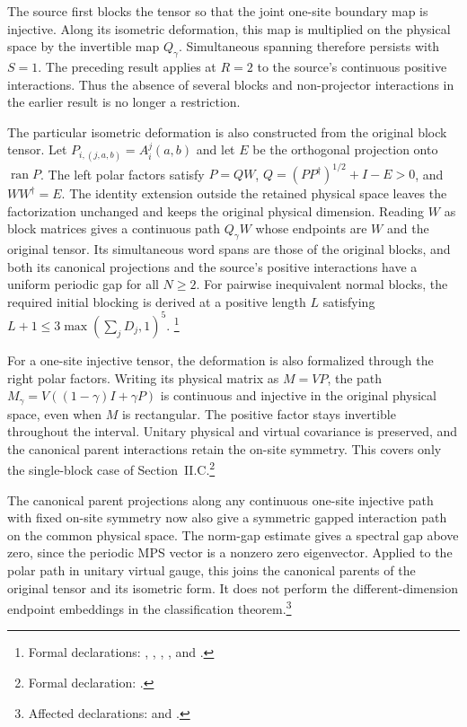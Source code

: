 \documentclass{article}
\begin{document}
The source first blocks the tensor so that the joint one-site boundary map
is injective. Along its isometric deformation, this map is multiplied on
the physical space by the invertible map $Q_\gamma$. Simultaneous spanning
therefore persists with $S=1$. The preceding result applies at $R=2$ to the
source's continuous positive interactions. Thus the absence of several
blocks and non-projector interactions in the earlier result is no longer
a restriction.

The particular isometric deformation is also constructed from the original
block tensor. Let $P_{i,(j,a,b)}=A_i^j(a,b)$ and let $E$ be the orthogonal
projection onto $\operatorname{ran}P$. The left polar factors satisfy
$P=QW$, $Q=(PP^\dagger)^{1/2}+I-E>0$, and $WW^\dagger=E$.
The identity extension outside the retained physical space leaves the
factorization unchanged and keeps the original physical dimension.
Reading $W$ as block matrices gives a continuous path $Q_\gamma W$ whose
endpoints are $W$ and the original tensor. Its simultaneous word spans
are those of the original blocks, and both its canonical projections and
the source's positive interactions have a uniform periodic gap for all
$N\geq2$. For pairwise inequivalent normal blocks, the required initial
blocking is derived at a positive length $L$ satisfying
$L+1\leq3\max(\sum_jD_j,1)^5$.
\footnote{Formal declarations:
    ,
    ,
    ,
    , and
    .}

For a one-site injective tensor, the deformation is also formalized through
the right polar factors. Writing its physical matrix as $M=VP$, the path
$M_\gamma=V((1-\gamma)I+\gamma P)$ is continuous and injective in the
original physical space, even when $M$ is rectangular. The positive factor
stays invertible throughout the interval. Unitary physical and virtual
covariance is preserved, and the canonical parent interactions retain the
on-site symmetry. This covers only the single-block case of
Section~II.C.\footnote{Formal declaration:
    .}

The canonical parent projections along any continuous one-site injective
path with fixed on-site symmetry now also give a symmetric gapped
interaction path on the common physical space. The norm-gap estimate
gives a spectral gap above zero, since the periodic MPS vector is a
nonzero zero eigenvector. Applied to the polar path in unitary virtual
gauge, this joins the canonical parents of the original tensor and
its isometric form. It does not perform the different-dimension
endpoint embeddings in the classification theorem.\footnote{Affected
    declarations:  and
    .}
\end{document}
